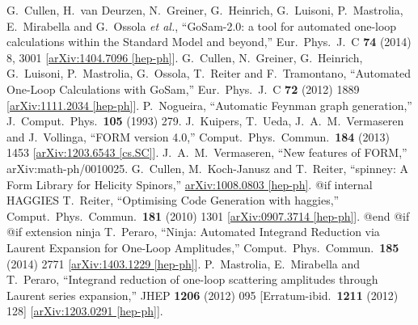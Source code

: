 {{{{{{{\begin{thebibliography}{ABC}
  G.~Cullen, H.~van Deurzen, N.~Greiner, G.~Heinrich, G.~Luisoni, P.~Mastrolia, E.~Mirabella and G.~Ossola {\it et al.},
  ``GoSam-2.0: a tool for automated one-loop calculations within the Standard Model and beyond,''
  Eur.\ Phys.\ J.\ C {\bf 74} (2014) 8,  3001
  [\href{http://arxiv.org/abs/1404.7096}{arXiv:1404.7096 [hep-ph]}].
  G.~Cullen, N.~Greiner, G.~Heinrich, G.~Luisoni, P.~Mastrolia, G.~Ossola, T.~Reiter and F.~Tramontano,
  ``Automated One-Loop Calculations with GoSam,''
  Eur.\ Phys.\ J.\ C {\bf 72} (2012) 1889
  [\href{http://arxiv.org/abs/1111.2034}{arXiv:1111.2034 [hep-ph]}].
  P.~Nogueira,
  ``Automatic Feynman graph generation,''
  J.\ Comput.\ Phys.\  {\bf 105} (1993) 279.
  J.~Kuipers, T.~Ueda, J.~A.~M.~Vermaseren and J.~Vollinga,
  ``FORM version 4.0,''
  Comput.\ Phys.\ Commun.\  {\bf 184} (2013) 1453
  [\href{http://arxiv.org/abs/1203.6543}{arXiv:1203.6543 [cs.SC]}].
  J.~A.~M.~Vermaseren,
  ``New features of FORM,''
  arXiv:math-ph/0010025.
  G.~Cullen, M.~Koch-Janusz and T.~Reiter,
  ``spinney: A Form Library for Helicity Spinors,''
  \href{http://arxiv.org/abs/1008.0803}{arXiv:1008.0803 [hep-ph]}.
@if internal HAGGIES %
  T.~Reiter,
  ``Optimising Code Generation with haggies,''
  Comput.\ Phys.\ Commun.\  {\bf 181} (2010) 1301
  [\href{http://arxiv.org/abs/0907.3714}{arXiv:0907.3714 [hep-ph]}].
@end @if %
@if extension ninja %
  T.~Peraro,
  ``Ninja: Automated Integrand Reduction via Laurent Expansion for One-Loop Amplitudes,''
  Comput.\ Phys.\ Commun.\  {\bf 185} (2014) 2771
  [\href{http://arxiv.org/abs/1403.1229}{arXiv:1403.1229 [hep-ph]}].
  P.~Mastrolia, E.~Mirabella and T.~Peraro,
  ``Integrand reduction of one-loop scattering amplitudes through Laurent series expansion,''
  JHEP {\bf 1206} (2012) 095
   [Erratum-ibid.\  {\bf 1211} (2012) 128]
  [\href{http://arxiv.org/abs/1203.0291}{arXiv:1203.0291 [hep-ph]}].

\end{thebibliography}}}}}}}}
